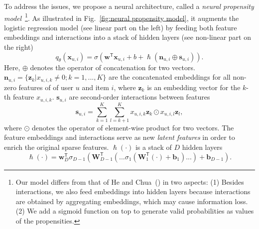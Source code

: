 \documentclass[letterpaper]{article} %
\newcommand{\transpose}{\mathsf{T}}
\newcommand{\matrixize}[1]{\mathbf{#1}}
\newcommand{\vectorize}[1]{\bm{#1}}
\newcommand{\lrdense}[2]{\smashoperator[lr]{#1_{#2}}}
\newcommand{\realNumber}{\mathbb{R}}
\newcommand{\nFeature}{K}
\newcommand{\iFeature}{k}
\newcommand{\featureMark}{x}
\newcommand{\biasedFeatures}{\vectorize{\featureMark}_{u,i}}
\newcommand{\feature}{\featureMark_{u,i,\iFeature}}
\newcommand{\lgBias}{b}
\newcommand{\lgWeight}{\vectorize{w}}
\newcommand{\nEmbedding}{E}
\newcommand{\sLayer}{L}
\newcommand{\nLayer}{D}
\newcommand{\iLayer}{d}
\newcommand{\npLinearBias}{\lgBias}
\newcommand{\npLinearWeight}{\lgWeight}
\newcommand{\npDeepBias}{\vectorize{b}}
\newcommand{\npDeepWeight}{\matrixize{W}}
\newcommand{\npLastLayer}{\vectorize{w}_\nLayer}
\newcommand{\npEmbedding}{\vectorize{z}}
\newcommand{\npNonZero}{\vectorize{n}_{u,i}}
\newcommand{\npSecondOrder}{\vectorize{s}}
\newcommand{\npAugmented}{\hslash} %
\newcommand{\propensityName}{q}
\newcommand{\propensityParam}{\theta}
\newcommand{\propensityModel}{\propensityName_\propensityParam(\biasedFeatures)}
\begin{document}
To address the issues, we propose a neural architecture, called a \emph{neural propensity model}~\footnote{Our model differs from that of He and Chua~(\citeyear{he2017neural}) in two aspects:
(1) Besides interactions, we also feed embeddings into hidden layers because interactions are obtained by aggregating embeddings, which may cause information loss.
(2) We add a sigmoid function on top to generate valid probabilities as values of the propensities.}.
As illustrated in Fig.~\ref{fig:neural propensity model}, it augments the logistic regression model (see linear part on the left) by feeding both feature embeddings and interactions into a stack of hidden layers (see non-linear part on the right)
\begin{equation*}
\propensityModel=\sigma(
  \npLinearWeight^\transpose\biasedFeatures+\npLinearBias
  +\npAugmented(\npNonZero\oplus\npSecondOrder_{u,i})
).
\end{equation*}%
Here, $\oplus$ denotes the operator of concatenation for two vectors.
$\npNonZero=\{\npEmbedding_\iFeature|\feature\neq0;\iFeature=1,...,\nFeature\}$ are the concatenated embeddings for all non-zero features of of user $u$ and item $i$, where $\npEmbedding_\iFeature$ is an embedding vector for the $\iFeature$-th feature $\feature$.
$\npSecondOrder_{u,i}$ are second-order interactions between features
\begin{equation*}
\npSecondOrder_{u,i}
=\sum_{\iFeature=1}^{\nFeature}\sum_{l=\iFeature+1}^{\nFeature}
\feature\npEmbedding_\iFeature\odot\featureMark_{u,i,l}\npEmbedding_l,
\end{equation*}%
where $\odot$ denotes the operator of element-wise product for two vectors.
The feature embeddings and interactions serve as new \emph{latent features} in order to enrich the original sparse features. 
$\npAugmented(\cdot)$ is a stack of $\nLayer$ hidden layers
\begin{equation*}
\npAugmented(\cdot)=\npLastLayer^\transpose\sigma_{\nLayer-1}(
  \npDeepWeight_{\nLayer-1}^\transpose(
    ...\sigma_1(\npDeepWeight_1^\transpose(\cdot)+\npDeepBias_1)...
  )+\npDeepBias_{\nLayer-1}
).
\end{equation*}%
\end{document}
